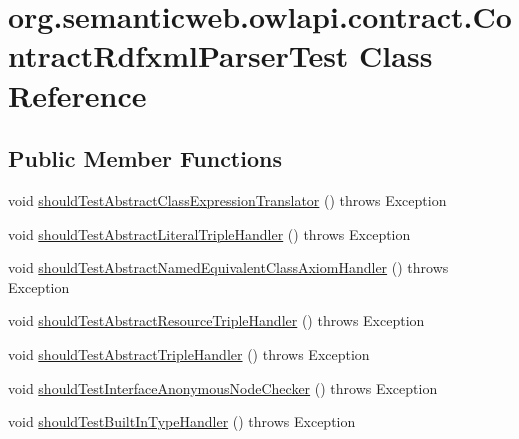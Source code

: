 \hypertarget{classorg_1_1semanticweb_1_1owlapi_1_1contract_1_1_contract_rdfxml_parser_test}{\section{org.\-semanticweb.\-owlapi.\-contract.\-Contract\-Rdfxml\-Parser\-Test Class Reference}
\label{classorg_1_1semanticweb_1_1owlapi_1_1contract_1_1_contract_rdfxml_parser_test}
}
\subsection*{Public Member Functions}
\begin{DoxyCompactItemize}
\item 
void \hyperlink{classorg_1_1semanticweb_1_1owlapi_1_1contract_1_1_contract_rdfxml_parser_test_aa3bda35ea7067039b0c17fe59200147d}{should\-Test\-Abstract\-Class\-Expression\-Translator} ()  throws Exception 
\item 
void \hyperlink{classorg_1_1semanticweb_1_1owlapi_1_1contract_1_1_contract_rdfxml_parser_test_abe95c2274dc4197182122a737bbec089}{should\-Test\-Abstract\-Literal\-Triple\-Handler} ()  throws Exception 
\item 
void \hyperlink{classorg_1_1semanticweb_1_1owlapi_1_1contract_1_1_contract_rdfxml_parser_test_a207fc82d86850625702a095959d69f9d}{should\-Test\-Abstract\-Named\-Equivalent\-Class\-Axiom\-Handler} ()  throws Exception 
\item 
void \hyperlink{classorg_1_1semanticweb_1_1owlapi_1_1contract_1_1_contract_rdfxml_parser_test_ae89c0929ea4694c70bc131dc36e79fc1}{should\-Test\-Abstract\-Resource\-Triple\-Handler} ()  throws Exception 
\item 
void \hyperlink{classorg_1_1semanticweb_1_1owlapi_1_1contract_1_1_contract_rdfxml_parser_test_addcd41e754cd6f830a918691daae6627}{should\-Test\-Abstract\-Triple\-Handler} ()  throws Exception 
\item 
void \hyperlink{classorg_1_1semanticweb_1_1owlapi_1_1contract_1_1_contract_rdfxml_parser_test_ab0c885bc1ccc59c82bb2b3871104ed22}{should\-Test\-Interface\-Anonymous\-Node\-Checker} ()  throws Exception 
\item 
void \hyperlink{classorg_1_1semanticweb_1_1owlapi_1_1contract_1_1_contract_rdfxml_parser_test_afd4174e9955bd52a71bf468b37a44e8a}{should\-Test\-Built\-In\-Type\-Handler} ()  throws Exception 
\item 

\end{DoxyCompactItemize}
